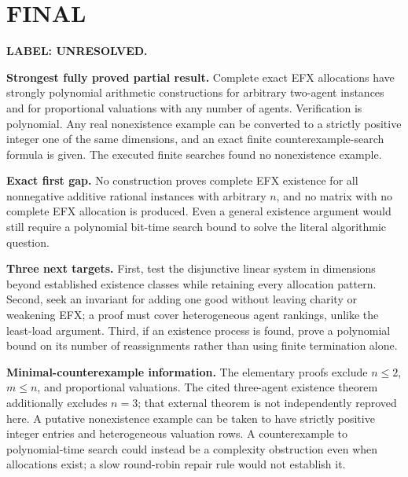 \documentclass[11pt,a4paper]{article}
\theoremstyle{definition}\newtheorem{definition}[theorem]{Definition}
\theoremstyle{remark}\newtheorem{remark}[theorem]{Remark}
\newcommand{\1}{\mathbf 1}
\begin{document}
\section{FINAL}
\textbf{LABEL: UNRESOLVED.}

\textbf{Strongest fully proved partial result.} Complete exact EFX allocations have strongly polynomial arithmetic constructions for arbitrary two-agent instances and for proportional valuations with any number of agents. Verification is polynomial. Any real nonexistence example can be converted to a strictly positive integer one of the same dimensions, and an exact finite counterexample-search formula is given. The executed finite searches found no nonexistence example.

\textbf{Exact first gap.} No construction proves complete EFX existence for all nonnegative additive rational instances with arbitrary $n$, and no matrix with no complete EFX allocation is produced. Even a general existence argument would still require a polynomial bit-time search bound to solve the literal algorithmic question.

\textbf{Three next targets.} First, test the disjunctive linear system in dimensions beyond established existence classes while retaining every allocation pattern. Second, seek an invariant for adding one good without leaving charity or weakening EFX; a proof must cover heterogeneous agent rankings, unlike the least-load argument. Third, if an existence process is found, prove a polynomial bound on its number of reassignments rather than using finite termination alone.

\textbf{Minimal-counterexample information.} The elementary proofs exclude $n\le2$, $m\le n$, and proportional valuations. The cited three-agent existence theorem additionally excludes $n=3$; that external theorem is not independently reproved here. A putative nonexistence example can be taken to have strictly positive integer entries and heterogeneous valuation rows. A counterexample to polynomial-time search could instead be a complexity obstruction even when allocations exist; a slow round-robin repair rule would not establish it.
\end{document}
